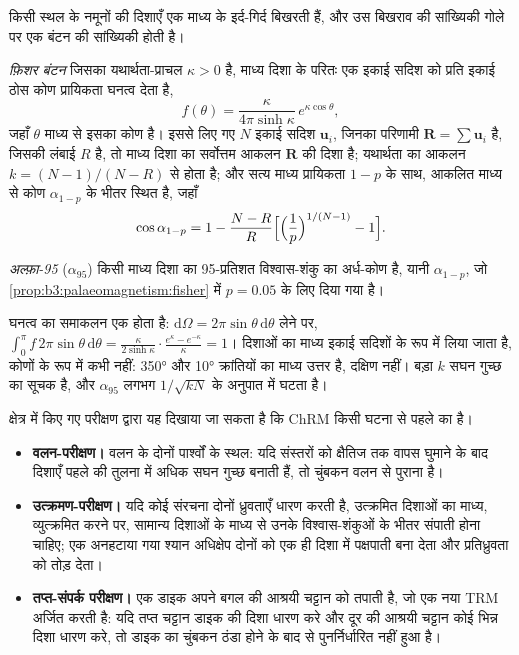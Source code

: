 किसी स्थल के नमूनों की दिशाएँ एक माध्य के इर्द-गिर्द बिखरती हैं, और
उस बिखराव की सांख्यिकी गोले पर एक बंटन की सांख्यिकी होती है।

\begin{proposition}[फ़िशर बंटन]\label{prop:b3:palaeomagnetism:fisher}
\emph{फ़िशर बंटन} जिसका यथार्थता-प्राचल
$\kappa > 0$ है, माध्य दिशा के परितः एक इकाई सदिश को
प्रति इकाई ठोस कोण प्रायिकता घनत्व देता है,
\[
  f(\theta) = \frac{\kappa}{4\pi\sinh\kappa}\,e^{\kappa\cos\theta},
\]
जहाँ $\theta$ माध्य से इसका कोण है। इससे लिए गए $N$ इकाई सदिश $\mathbf u_i$,
जिनका परिणामी $\mathbf R = \sum\mathbf u_i$ है, जिसकी लंबाई $R$ है,
तो माध्य दिशा का सर्वोत्तम आकलन $\mathbf R$ की दिशा है; यथार्थता का
आकलन $k = (N - 1)/(N - R)$ से होता है; और सत्य माध्य प्रायिकता $1 - p$ के साथ,
आकलित माध्य से कोण $\alpha_{1-p}$ के भीतर स्थित है, जहाँ
\[
  \cos\alpha_{1-p} = 1 - \frac{N - R}{R}\Bigl[\Bigl(\frac1p\Bigr)^{1/(N-1)} - 1\Bigr].
\]
\end{proposition}
\admitted

\begin{definition}[अल्फ़ा-95]\label{def:b3:palaeomagnetism:a95}
\emph{अल्फ़ा-95} ($\alpha_{95}$) किसी माध्य दिशा का
95-प्रतिशत विश्वास-शंकु का अर्ध-कोण है, यानी $\alpha_{1-p}$, जो
\cref{prop:b3:palaeomagnetism:fisher} में $p = 0.05$ के लिए दिया गया है।
\end{definition}

घनत्व का समाकलन एक होता है: $\mathrm d\Omega = 2\pi\sin\theta\,\mathrm
d\theta$ लेने पर, $\int_0^\pi f\,2\pi\sin\theta\,\mathrm d\theta =
\frac{\kappa}{2\sinh\kappa}\cdot\frac{e^\kappa - e^{-\kappa}}{\kappa} = 1$। दिशाओं का माध्य इकाई सदिशों के रूप में लिया जाता है,
कोणों के रूप में कभी नहीं: \ang{350} और \ang{10} क्रांतियों का माध्य
उत्तर है, दक्षिण नहीं। बड़ा $k$ सघन गुच्छ का सूचक है, और $\alpha_{95}$
लगभग $1/\sqrt{kN}$ के अनुपात में घटता है।

\begin{method}[पुराचुंबकीय दिशा के क्षेत्र-परीक्षण]\label{met:b3:palaeomagnetism:tests}
क्षेत्र में किए गए परीक्षण द्वारा यह दिखाया जा सकता है कि ChRM किसी घटना से पहले का है।
\begin{itemize}
  \item \textbf{वलन-परीक्षण।} वलन के दोनों पार्श्वों के स्थल: यदि
        संस्तरों को क्षैतिज तक वापस घुमाने के बाद दिशाएँ पहले की तुलना में
        अधिक सघन गुच्छ बनाती हैं, तो चुंबकन वलन से पुराना है।
  \item \textbf{उत्क्रमण-परीक्षण।} यदि कोई संरचना दोनों ध्रुवताएँ धारण करती है,
        उत्क्रमित दिशाओं का माध्य, व्युत्क्रमित करने पर, सामान्य दिशाओं के माध्य से
        उनके विश्वास-शंकुओं के भीतर संपाती होना चाहिए; एक अनहटाया गया श्यान अधिक्षेप
        दोनों को एक ही दिशा में पक्षपाती बना देता और प्रतिध्रुवता को तोड़ देता।
  \item \textbf{तप्त-संपर्क परीक्षण।} एक डाइक अपने बगल की आश्रयी चट्टान को तपाती है,
        जो एक नया TRM अर्जित करती है: यदि तप्त चट्टान डाइक की दिशा धारण करे
        और दूर की आश्रयी चट्टान कोई भिन्न दिशा धारण करे, तो डाइक का चुंबकन
        ठंडा होने के बाद से पुनर्निर्धारित नहीं हुआ है।
\end{itemize}
\end{method}

